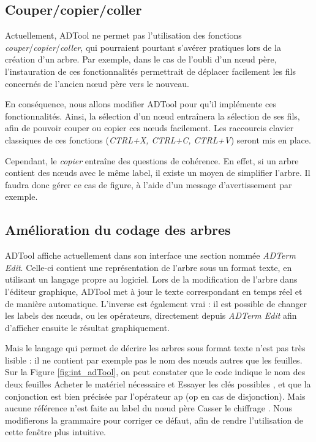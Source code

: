 	
	\subsection{Couper/copier/coller}	
		Actuellement, ADTool ne permet pas l'utilisation des fonctions \emph{couper}/\emph{copier}/\emph{coller}, qui pourraient pourtant s'avérer pratiques lors de la création d'un arbre. Par exemple, dans le cas de l'oubli d'un nœud père, l'instauration de ces fonctionnalités permettrait de déplacer facilement les fils concernés de l'ancien nœud père vers le nouveau.
		
		En conséquence, nous allons modifier ADTool pour qu'il implémente ces fonctionnalités. Ainsi, la sélection d'un nœud entraînera la sélection de ses fils, afin de pouvoir couper ou copier ces nœuds facilement. Les raccourcis clavier \og classiques \fg{}  de ces fonctions (\emph{CTRL+X, CTRL+C, CTRL+V}) seront mis en place.

		Cependant, le \emph{copier} entraîne des questions de cohérence. En effet, si un arbre contient des nœuds avec le même label, il existe un moyen de simplifier l'arbre. Il faudra donc gérer ce cas de figure, à l'aide d'un message d'avertissement par exemple.

	\subsection{Amélioration du codage des arbres}
		ADTool affiche actuellement dans son interface une section nommée \emph{ADTerm Edit}. Celle-ci contient une représentation de l'arbre sous un format texte, en utilisant un langage propre au logiciel. Lors de la modification de l'arbre dans l'éditeur graphique, ADTool met à jour le texte correspondant en temps réel et de manière automatique. L'inverse est également vrai : il est possible de changer les labels des nœuds, ou les opérateurs, directement depuis \emph{ADTerm Edit} afin d'afficher ensuite le résultat graphiquement.

		Mais le langage qui permet de décrire les arbres sous format texte n'est pas très lisible : il ne contient par exemple pas le nom des nœuds autres que les feuilles. Sur la {\sc Figure} \ref{fig:int_adTool}, on peut constater que le code indique le nom des deux feuilles \og Acheter le matériel nécessaire \fg{} et \og Essayer les clés possibles \fg{}, et que la conjonction est bien précisée par l'opérateur \og ap \fg{} (\og op \fg{} en cas de disjonction). Mais aucune référence n'est faite au label du nœud père \og Casser le chiffrage \fg{}. Nous modifierons la grammaire pour corriger ce défaut, afin de rendre l'utilisation de cette fenêtre plus intuitive.

